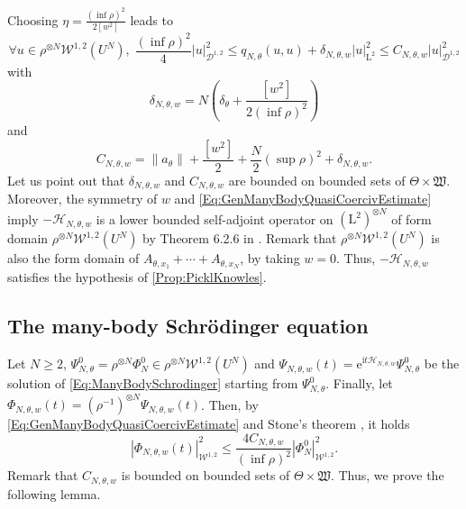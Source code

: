 \documentclass{article}
\def\W{\mathcal W}
\def\L{\mathrm L}
\theoremstyle{definition}
\numberwithin{equation}{section}
\newcommand{\e}{\mathrm{e}} %
\newcommand{\complexI}{\mathrm{i}} %
\begin{document}
Choosing $\eta = \frac{(\inf \rho)^2}{2\left[w^2\right]}$ leads to
\begin{equation}\label{Eq:GenManyBodyQuasiCoercivEstimate}
    \forall u\in\rho^{\otimes N}\W^{1,2}(U^N),\; \frac{(\inf \rho)^{2}}{4}|u|_{\mathcal{D}^{1,2}}^2 \leqslant q_{N,\theta}(u,u)+\delta_{N,\theta,w}|u|_{\L^2}^2 \leqslant C_{N,\theta,w} |u|_{\mathcal{D}^{1,2}}^2
\end{equation}
with 
\begin{equation}\label{Eq:deltaNtheta}
    \delta_{N,\theta,w} = N\left(\delta_\theta + \frac{\left[w^2\right]}{2(\inf \rho)^2}\right)
\end{equation}
and 
\begin{equation}\label{Eq:CNtheta}
    C_{N,\theta,w} = \|a_\theta\|+\frac{\left[w^2\right]}{2}+\frac{N}{2}(\sup \rho)^2 + \delta_{N,\theta,w}.
\end{equation}
Let us point out that $\delta_{N,\theta,w}$ and $C_{N,\theta,w}$ are bounded on bounded sets of $\Theta\times\mathfrak{W}$. Moreover, the symmetry of $w$ and \cref{Eq:GenManyBodyQuasiCoercivEstimate} imply $-\mathcal{H}_{N,\theta,w}$ is a lower bounded self-adjoint operator on $(\L^2)^{\otimes N}$ of form domain $\rho^{\otimes N}\W^{1,2}(U^N)$ by Theorem 6.2.6 in \cite{KatoPerturbationBook}. Remark that $\rho^{\otimes N}\W^{1,2}(U^N)$ is also the form domain of $A_{\theta,x_1}+\cdots+A_{\theta,x_N}$, by taking $w=0$. Thus, $-\mathcal{H}_{N,\theta,w}$ satisfies the hypothesis of \cref{Prop:PicklKnowles}.

\subsection{The many-body Schrödinger equation}

Let $N\geqslant 2$, $\Psi_{N,\theta}^0=\rho^{\otimes N}\Phi_N^0\in\rho^{\otimes N}\W^{1,2}(U^N)$ and $\Psi_{N,\theta,w}(t) = \e^{\complexI t \mathcal{H}_{N,\theta,w}}\Psi_{N,\theta}^0$ be the solution of \cref{Eq:ManyBodySchrodinger} starting from $\Psi_{N,\theta}^0$. Finally, let $\Phi_{N,\theta,w}(t)=\left(\rho^{-1}\right)^{\otimes N}\Psi_{N,\theta,w}(t)$. Then, by \cref{Eq:GenManyBodyQuasiCoercivEstimate} and Stone's theorem \cite{StoneOneParameterGroup}, it holds
\begin{equation}\label{Eq:BoundPhiNtheta}
    |\Phi_{N,\theta,w}(t)|_{\W^{1,2}}^2 \leqslant \frac{4C_{N,\theta,w}}{(\inf \rho)^2}|\Phi_N^0|_{\W^{1,2}}^2.
\end{equation}
Remark that $C_{N,\theta,w}$ is bounded on bounded sets of $\Theta\times\mathfrak{W}$. Thus, we prove the following lemma.
\end{document}
